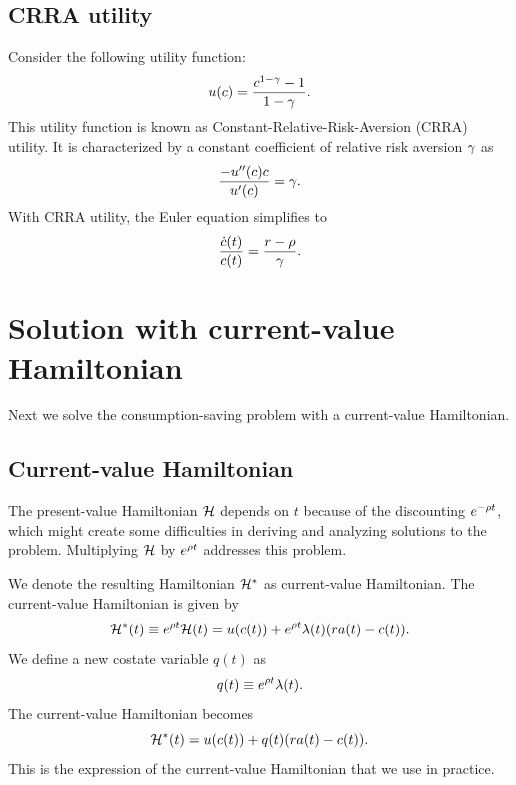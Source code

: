 \documentclass[letterpaper, 11pt, leqno]{article}
\begin{document}
\subsection{CRRA utility}

Consider the following utility function:
\begin{equation*}
u(c) =\frac{c^{1-\gamma}-1}{1-\gamma}.
\end{equation*}
This utility function is known as Constant-Relative-Risk-Aversion (CRRA) utility. It is characterized by a constant coefficient of relative risk aversion $\gamma$ as
\begin{equation*}
\frac{-u''(c) c}{u'(c)}=\gamma.
\end{equation*}
With CRRA utility, the Euler equation simplifies to
\begin{equation*}
\frac{\dot{c}(t)}{c(t)}=\frac{r-\rho}{\gamma}.
\end{equation*}

\section{Solution with current-value Hamiltonian}

Next we solve the consumption-saving problem with a current-value Hamiltonian.

\subsection{Current-value Hamiltonian}

The present-value Hamiltonian $\mathcal{H}$ depends on $t$ because of the discounting $e^{-\rho t}$, which might create some difficulties in deriving and analyzing solutions to the problem. Multiplying $\mathcal{H}$ by $e^{\rho t}$ addresses this problem. 

We denote the resulting Hamiltonian $\mathcal{H}^{*}$ as current-value Hamiltonian. The current-value Hamiltonian is given by
\begin{equation*}
\mathcal{H}^{*}(t)\equiv e^{\rho t} \mathcal{H}(t)=u(c(t)) +e^{\rho t} \lambda(t) (r a(t)-c(t)).
\end{equation*}
We define a new costate variable $q(t)$ as
\begin{equation*}
q(t)\equiv e^{\rho t} \lambda(t).
\end{equation*}
The current-value Hamiltonian becomes
\begin{equation*}
\mathcal{H}^{*}(t)= u(c(t)) +q(t) (r a(t)-c(t)).
\end{equation*}
This is the expression of the current-value Hamiltonian that we use in practice.
\end{document}
